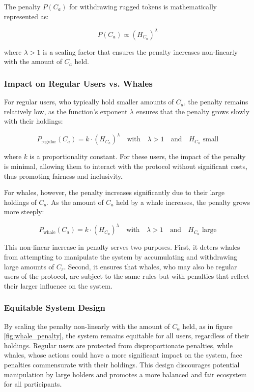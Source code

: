 \documentclass{article}
\begin{document}
The penalty $P(C_a)$ for withdrawing rugged tokens is mathematically represented as:

\[
P(C_a) \propto \left(H_{C_a}\right)^\lambda
\]

where $\lambda > 1$ is a scaling factor that ensures the penalty increases non-linearly with the amount of $C_a$ held.

\subsubsection{Impact on Regular Users vs. Whales}

For regular users, who typically hold smaller amounts of $C_a$, the penalty remains relatively low, as the function’s exponent $\lambda$ ensures that the penalty grows slowly with their holdings:

\[
P_{\text{regular}}(C_a) = k \cdot \left(H_{C_a}\right)^\lambda \quad \text{with} \quad \lambda > 1 \quad \text{and} \quad H_{C_a} \text{ small}
\]

where $k$ is a proportionality constant. For these users, the impact of the penalty is minimal, allowing them to interact with the protocol without significant costs, thus promoting fairness and inclusivity.

For whales, however, the penalty increases significantly due to their large holdings of $C_a$. As the amount of $C_a$ held by a whale increases, the penalty grows more steeply:

\[
P_{\text{whale}}(C_a) = k \cdot \left(H_{C_a}\right)^\lambda \quad \text{with} \quad \lambda > 1 \quad \text{and} \quad H_{C_a} \text{ large}
\]

This non-linear increase in penalty serves two purposes. First, it deters whales from attempting to manipulate the system by accumulating and withdrawing large amounts of $C_r$. Second, it ensures that whales, who may also be regular users of the protocol, are subject to the same rules but with penalties that reflect their larger influence on the system.

\subsubsection{Equitable System Design}

By scaling the penalty non-linearly with the amount of $C_a$ held, as in figure \ref{fig:whale_penalty}, the system remains equitable for all users, regardless of their holdings. Regular users are protected from disproportionate penalties, while whales, whose actions could have a more significant impact on the system, face penalties commensurate with their holdings. This design discourages potential manipulation by large holders and promotes a more balanced and fair ecosystem for all participants.
\end{document}
